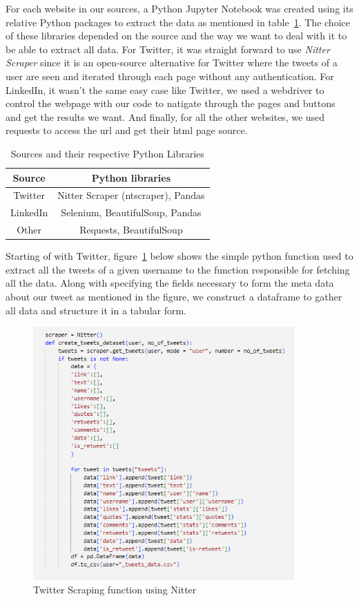 For each website in our sources, a Python Jupyter Notebook was created using its relative Python packages to extract the data as mentioned in table~\ref{tab:pythonLibraries}. The choice of these libraries depended on the source and the way we want to deal with it to be able to extract all data. For Twitter, it was straight forward to use \textit{Nitter Scraper} since it is an open-source alternative for Twitter where the tweets of a user are seen and iterated through each page without any authentication. For LinkedIn, it wasn't the same easy case like Twitter, we used a webdriver to control the webpage with our code to natigate through the pages and buttons and get the results we want. And finally, for all the other websites, we used requests to access the \ac{url} and get their \ac{html} page source.

\begin{table}[!ht]
    \centering
    \begin{tabular}{|c|c|}
    \hline
        Source & Python libraries\\ \hline
        Twitter & Nitter Scraper (ntscraper), Pandas \\
        LinkedIn & Selenium, BeautifulSoup, Pandas \\
        Other & Requests, BeautifulSoup \\ \hline
    \end{tabular}
    \caption{Sources and their respective Python Libraries}
    \label{tab:pythonLibraries}
\end{table}

Starting of with Twitter, figure~\ref{fig:twitter} below shows the simple python function used to extract all the tweets of a given username to the function responsible for fetching all the data. Along with specifying the fields necessary to form the meta data about our tweet as mentioned in the figure, we construct a dataframe to gather all data and structure it in a tabular form.

\begin{figure}[H]
\centering
\includegraphics[width=10cm]{twitter}
\caption{Twitter Scraping function using Nitter}
\label{fig:twitter}
\end{figure}

